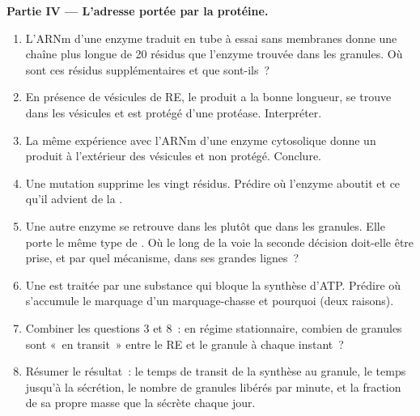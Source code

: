 \begin{problem}
\medskip
\noindent\textbf{Partie IV --- L'adresse portée par la protéine.}
\begin{enumerate}[resume]
  \item L'ARNm d'une enzyme traduit en tube à essai sans membranes donne
        une chaîne plus longue de \qty{20}{} résidus que l'enzyme
        trouvée dans les granules. Où sont ces résidus supplémentaires
        et que sont-ils~?
  \item En présence de vésicules de RE, le produit a la bonne longueur,
        se trouve dans les vésicules et est protégé d'une protéase.
        Interpréter.
  \item La même expérience avec l'ARNm d'une enzyme cytosolique donne un
        produit à l'extérieur des vésicules et non protégé. Conclure.
  \item Une mutation supprime les vingt résidus. Prédire où l'enzyme
        aboutit et ce qu'il advient de la .
  \item Une autre enzyme se retrouve dans les  plutôt que dans
        les granules. Elle porte le même type de . Où le
        long de la voie la seconde décision doit-elle être prise, et par
        quel mécanisme, dans ses grandes lignes~?
  \item Une  est traitée par une substance qui bloque la
        synthèse d'ATP. Prédire où s'accumule le marquage d'un
        marquage-chasse et pourquoi (deux raisons).
  \item Combiner les questions 3 et 8~: en régime stationnaire, combien
        de granules sont «~en transit~» entre le RE et le granule à
        chaque instant~?
  \item Résumer le résultat~: le temps de transit de la synthèse au
        granule, le temps jusqu'à la sécrétion, le nombre de granules
        libérés par minute, et la fraction de sa propre masse que la
         sécrète chaque jour.
\end{enumerate}
\end{problem}
